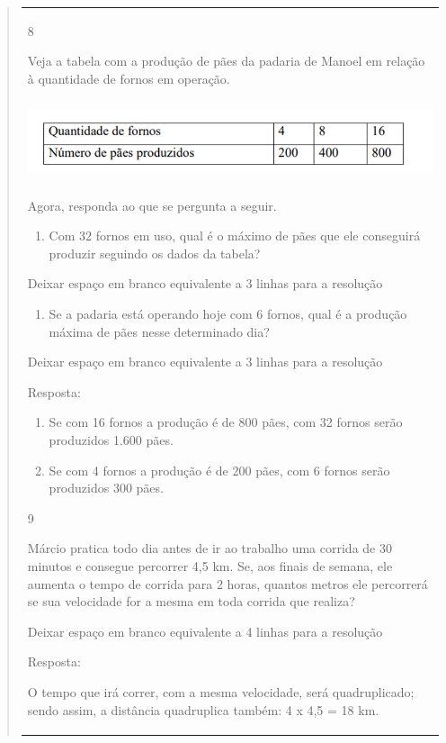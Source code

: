 \begin{mdframed}[linewidth=2pt,linecolor=salmao,roundcorner=2pt]
\begin{itemize}
{\begin{itemize}
\begin{escolha}
{\begin{quote}
{\begin{escolha}
{{{{{\begin{longtable}[]{@{}l@{}}
\begin{itemize}
\num{8}

Veja a tabela com a produção de pães da padaria de Manoel em
relação à quantidade de fornos em operação.


\includegraphics[width=5.90556in,height=0.92222in]{media/image131.png}

Agora, responda ao que se pergunta a seguir.

\begin{enumerate}
\item
  Com 32 fornos em uso, qual é o máximo de pães que ele conseguirá
  produzir seguindo os dados da tabela?
\end{enumerate}

Deixar espaço em branco equivalente a 3 linhas para a resolução

\begin{enumerate}
\item
  Se a padaria está operando hoje com 6 fornos, qual é a produção máxima
  de pães nesse determinado dia?
\end{enumerate}

Deixar espaço em branco equivalente a 3 linhas para a resolução

Resposta:

\begin{enumerate}
\item
  Se com 16 fornos a produção é de 800 pães, com 32 fornos serão produzidos 1.600 pães.
\item
  Se com 4 fornos a produção é de 200 pães, com 6 fornos serão produzidos 300 pães.
\end{enumerate}

\num{9}

Márcio pratica todo dia antes de ir ao trabalho uma corrida de 30
minutos e consegue percorrer 4,5 km. Se, aos finais de semana, ele aumenta o
tempo de corrida para 2 horas, quantos metros ele percorrerá se sua
velocidade for a mesma em toda corrida que realiza?

Deixar espaço em branco equivalente a 4 linhas para a resolução

Resposta:

O tempo que irá correr, com a mesma velocidade, será quadruplicado; sendo assim, a distância quadruplica também: 4 x 4,5 = 18 km.


\end{itemize}
\end{longtable}}}}}}
\end{escolha}}
\end{quote}}
\end{escolha}
\end{itemize}}
\end{itemize}
\end{mdframed}
